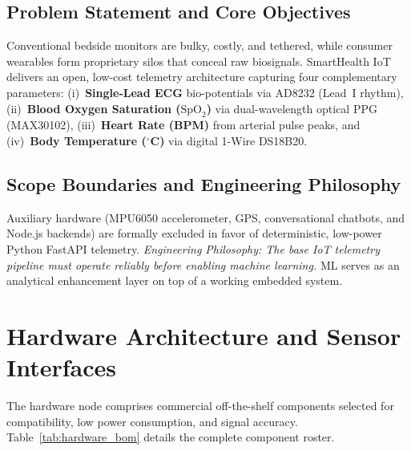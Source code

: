 \documentclass[12pt]{article}
\begin{document}
\subsection{Problem Statement and Core Objectives}
Conventional bedside monitors are bulky, costly, and tethered, while consumer wearables form proprietary silos that conceal raw biosignals. SmartHealth IoT delivers an open, low-cost telemetry architecture capturing four complementary parameters: (i)~\textbf{Single-Lead ECG} bio-potentials via AD8232 (Lead~I rhythm), (ii)~\textbf{Blood Oxygen Saturation ($\text{SpO}_2$)} via dual-wavelength optical PPG (MAX30102), (iii)~\textbf{Heart Rate (BPM)} from arterial pulse peaks, and (iv)~\textbf{Body Temperature ($^\circ$C)} via digital 1-Wire DS18B20.

\subsection{Scope Boundaries and Engineering Philosophy}
Auxiliary hardware (MPU6050 accelerometer, GPS, conversational chatbots, and Node.js backends) are formally excluded in favor of deterministic, low-power Python FastAPI telemetry. \textit{Engineering Philosophy: The base IoT telemetry pipeline must operate reliably before enabling machine learning.} ML serves as an analytical enhancement layer on top of a working embedded system.

\vspace{0.06cm}
\section{Hardware Architecture and Sensor Interfaces}
\label{sec:hardware_architecture}

\vspace{0.02cm}
\par
\vspace{0.02cm}
The hardware node comprises commercial off-the-shelf components selected for compatibility, low power consumption, and signal accuracy. Table~\ref{tab:hardware_bom} details the complete component roster.
\end{document}

